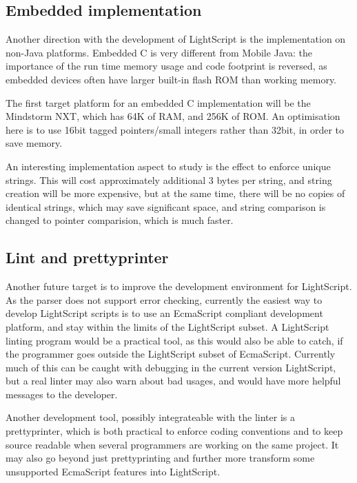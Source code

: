 \documentclass[11pt]{report}
\begin{document}
\subsection{Embedded implementation}

Another direction with the development of LightScript is the implementation on non-Java platforms.
Embedded C is very different from Mobile Java: the importance of the run time memory usage and code footprint is reversed, as embedded devices often have larger built-in flash ROM than working memory.

The first target platform for an embedded C implementation will be the Mindstorm NXT, which has 64K of RAM, and 256K of ROM.
An optimisation here is to use 16bit tagged pointers/small integers rather than 32bit, in order to save memory. 

An interesting implementation aspect to study is the effect to enforce unique strings. This will cost approximately additional 3 bytes per string, and string creation will be more expensive, but at the same time, there will be no copies of identical strings, which may save significant space, and string comparison is changed to pointer comparision, which is much faster.

\subsection{Lint and prettyprinter}

Another future target is to improve the development environment for LightScript.
As the parser does not support error checking, currently the easiest way to develop LightScript scripts is to use an EcmaScript compliant development platform, and stay within the limits of the LightScript subset.
A LightScript linting program would be a practical tool, as this would also be able to catch, if the programmer goes outside the LightScript subset of EcmaScript.
Currently much of this can be caught with debugging in the current version LightScript, but a real linter may also warn about bad usages, and would have more helpful messages to the developer.

Another development tool, possibly integrateable with the linter is a prettyprinter, which is both practical to enforce coding conventions and to keep source readable when several programmers are working on the same project. It may also go beyond just prettyprinting and further more transform some unsupported EcmaScript features into LightScript.
\end{document}
